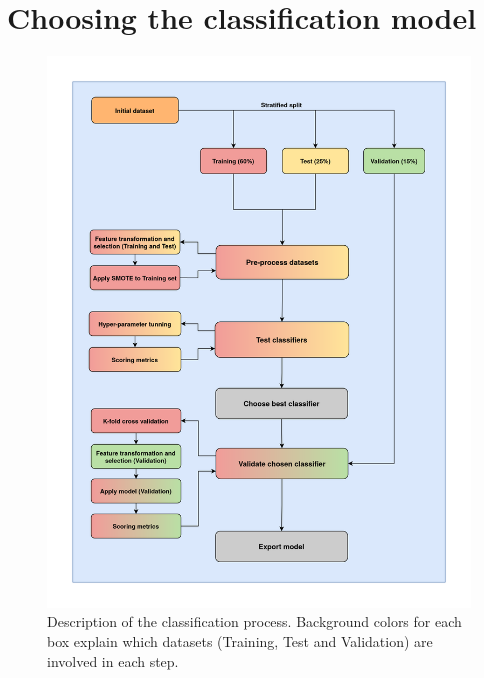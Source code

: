 \documentclass[a4paper, 12pt]{book}
\begin{document}
\section{Choosing the classification model} 
\label{sec:exp-classification-models}


\begin{figure}
 \centering
  \includegraphics[width=16cm, keepaspectratio]{img/process-classification-models.png}
  \caption{Description of the classification process. Background colors for each box explain which datasets (Training, Test and Validation) are involved in each step.}
  \label{fig:model-classification-process}
\end{figure}
\end{document}
